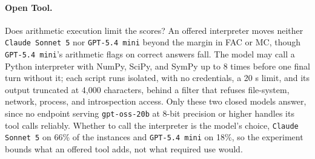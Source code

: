 \paragraph{Open Tool.} Does arithmetic execution limit the scores?
An offered interpreter moves neither \texttt{Claude Sonnet 5} nor \texttt{GPT-5.4 mini} beyond the
margin in FAC or MC, though \texttt{GPT-5.4 mini}'s arithmetic flags on correct answers fall.
The model may call a Python interpreter with NumPy, SciPy, and SymPy up to 8 times before one final
turn without it; each script runs isolated, with no credentials, a 20 s limit, and its output
truncated at 4,000 characters, behind a filter that refuses file-system, network, process, and
introspection access.
Only these two closed models answer, since no endpoint serving \texttt{gpt-oss-20b} at 8-bit
precision or higher handles its tool calls reliably.
Whether to call the interpreter is the model's choice, \texttt{Claude Sonnet 5} on 66\% of the
instances and \texttt{GPT-5.4 mini} on 18\%, so the experiment bounds what an offered tool adds, not
what required use would.

